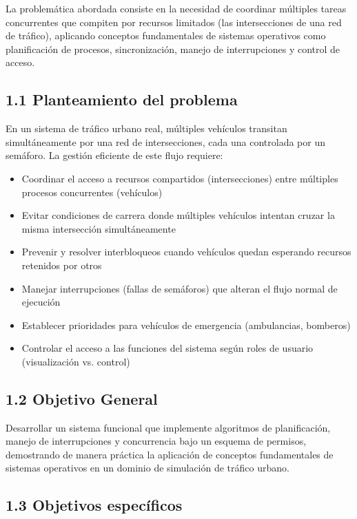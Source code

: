 \documentclass[12pt,a4paper]{article}
\begin{document}
La problemática abordada consiste en la necesidad de coordinar múltiples tareas concurrentes que compiten por recursos limitados (las intersecciones de una red de tráfico), aplicando conceptos fundamentales de sistemas operativos como planificación de procesos, sincronización, manejo de interrupciones y control de acceso.

\subsection{1.1 Planteamiento del problema}

En un sistema de tráfico urbano real, múltiples vehículos transitan simultáneamente por una red de intersecciones, cada una controlada por un semáforo. La gestión eficiente de este flujo requiere:

\begin{itemize}
    \item Coordinar el acceso a recursos compartidos (intersecciones) entre múltiples procesos concurrentes (vehículos)
    \item Evitar condiciones de carrera donde múltiples vehículos intentan cruzar la misma intersección simultáneamente
    \item Prevenir y resolver interbloqueos cuando vehículos quedan esperando recursos retenidos por otros
    \item Manejar interrupciones (fallas de semáforos) que alteran el flujo normal de ejecución
    \item Establecer prioridades para vehículos de emergencia (ambulancias, bomberos)
    \item Controlar el acceso a las funciones del sistema según roles de usuario (visualización vs. control)
\end{itemize}

\subsection{1.2 Objetivo General}

Desarrollar un sistema funcional que implemente algoritmos de planificación, manejo de interrupciones y concurrencia bajo un esquema de permisos, demostrando de manera práctica la aplicación de conceptos fundamentales de sistemas operativos en un dominio de simulación de tráfico urbano.

\subsection{1.3 Objetivos específicos}
\end{document}

